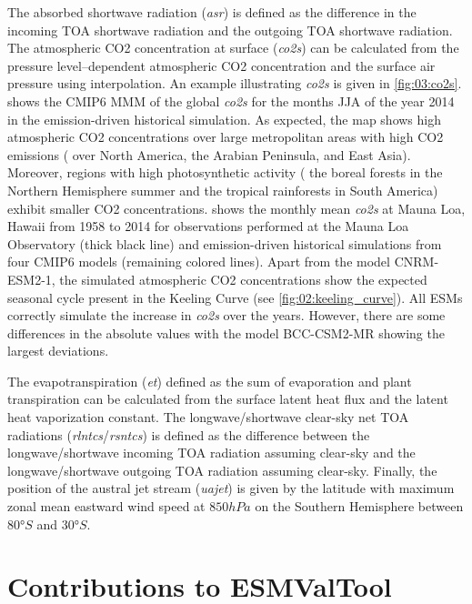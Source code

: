 The absorbed shortwave radiation (\emph{asr}) is defined as the difference in
the incoming \ac{TOA} shortwave radiation and the outgoing \ac{TOA} shortwave
radiation. The atmospheric \ac{CO2} concentration at surface (\emph{co2s}) can
be calculated from the pressure level--dependent atmospheric \ac{CO2}
concentration and the surface air pressure using interpolation. An example
illustrating \emph{co2s} is given in \cref{fig:03:co2s}. 
shows the \acs{CMIP}6 \ac{MMM} of the global \emph{co2s} for the months
\acf{JJA} of the year 2014 in the emission-driven historical simulation. As
expected, the map shows high atmospheric \ac{CO2} concentrations over large
metropolitan areas with high \ac{CO2} emissions (\eg{} over North America, the
Arabian Peninsula, and East Asia). Moreover, regions with high photosynthetic
activity (\eg{} the boreal forests in the Northern Hemisphere summer and the
tropical rainforests in South America) exhibit smaller \ac{CO2} concentrations.
 shows the monthly mean \emph{co2s} at Mauna Loa, Hawaii
from 1958 to 2014 for observations performed at the Mauna Loa Observatory
\autocite{Keeling2005} (thick black line) and emission-driven historical
simulations from four \acs{CMIP}6 models (remaining colored lines). Apart from
the model CNRM-ESM2-1, the simulated atmospheric \ac{CO2} concentrations show
the expected seasonal cycle present in the Keeling Curve (see
\cref{fig:02:keeling_curve}). All \acp{ESM} correctly simulate the increase in
\emph{co2s} over the years. However, there are some differences in the absolute
values with the model BCC-CSM2-MR showing the largest deviations.

The evapotranspiration (\emph{et}) defined as the sum of evaporation and plant
transpiration can be calculated from the surface latent heat flux and the
latent heat vaporization constant. The longwave/shortwave clear-sky net
\ac{TOA} radiations (\emph{rlntcs}/\emph{rsntcs}) is defined as the difference
between the longwave/shortwave incoming \ac{TOA} radiation assuming clear-sky
and the longwave/shortwave outgoing \ac{TOA} radiation assuming clear-sky.
Finally, the position of the austral jet stream (\emph{uajet}) is given by the
latitude with maximum zonal mean eastward wind speed at $850 \unit{hPa}$ on the
Southern Hemisphere between $80 \unit{\degree S}$ and $30 \unit{\degree S}$.


\section{Contributions to \acs{ESMValTool}}
\label{sec:03:contributions_to_esmvaltool}

